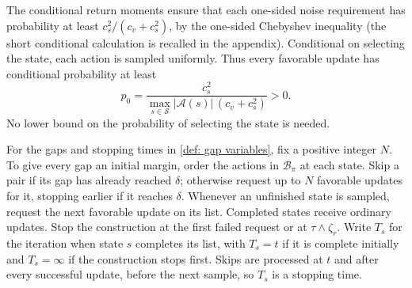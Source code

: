 The conditional return moments ensure that each one-sided noise requirement has probability at least $c_s^2/(c_v+c_s^2)$, by the one-sided Chebyshev inequality (the short conditional calculation is recalled in the appendix). Conditional on selecting the state, each action is sampled uniformly. Thus every favorable update has conditional probability at least
\begin{equation}
\label{eq:localprob}
p_0=\frac{c_s^2}{\max_{s\in\mathcal S}|\mathcal A(s)|\,(c_v+c_s^2)}>0.
\end{equation}
No lower bound on the probability of selecting the state is needed.

\begin{definition}
\label{def: seed construction}
For the gaps and stopping times in \autoref{def: gap variables}, fix a positive integer $N$. To give every gap an initial margin, order the actions in $\mathcal B_\pi$ at each state. Skip a pair if its gap has already reached $\delta$; otherwise request up to $N$ favorable updates for it, stopping earlier if it reaches $\delta$. Whenever an unfinished state is sampled, request the next favorable update on its list. Completed states receive ordinary updates. Stop the construction at the first failed request or at $\tau\wedge\zeta_r$.
Write $T_s$ for the iteration when state $s$ completes its list, with $T_s=t$ if it is complete initially and $T_s=\infty$ if the construction stops first. Skips are processed at $t$ and after every successful update, before the next sample, so $T_s$ is a stopping time.
\end{definition}

